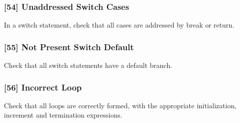\subsubsection{[54] Unaddressed Switch Cases}
In a switch statement, check that all cases are addressed by break or return.
\subsubsection{[55] Not Present Switch Default}
Check that all switch statements have a default branch.
\subsubsection{[56] Incorrect Loop}
Check that all loops are correctly formed, with the appropriate initialization, increment and termination expressions.